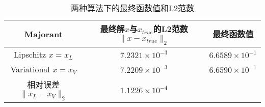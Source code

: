 \documentclass{homework}
\begin{document}
\begin{sol}

\begin{table}[h]
\caption{两种算法下的最终函数值和L2范数}\label{4-2}
\begin{tabular}{ccc}
\toprule
\textbf{Majorant} & \makecell{\textbf{最终解$x$与$x_{true}$的L2范数}\\$\|x-x_{true}\|_2$} & \textbf{最终函数值} \\
\midrule
Lipschitz $x=x_L$  & $7.2321 \times 10^{-3}$ & $6.6589 \times 10^{-1}$\\
Variational $x=x_V$  & $7.2209 \times 10^{-3}$ & $6.6590 \times 10^{-1}$ \\
相对误差$\|x_L-x_V\|_2$ & $1.1226 \times 10^{-4}$ & \\
\bottomrule
\end{tabular}
\end{table}

\end{sol}



% 
% 
\end{document}
